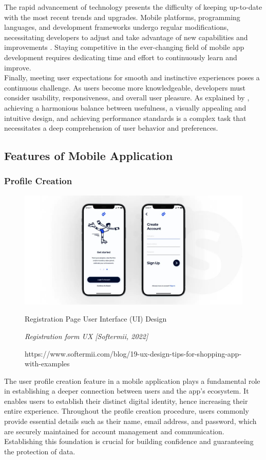 The rapid advancement of technology presents the difficulty of keeping up-to-date with the most recent trends and upgrades. Mobile platforms, programming languages, and development frameworks undergo regular modifications, necessitating developers to adjust and take advantage of new capabilities and improvements \parencite{syeed21}. Staying competitive in the ever-changing field of mobile app development requires dedicating time and effort to continuously learn and improve. \\

Finally, meeting user expectations for smooth and instinctive experiences poses a continuous challenge. As users become more knowledgeable, developers must consider usability, responsiveness, and overall user pleasure. As explained by \textcite{olawole18}, achieving a harmonious balance between usefulness, a visually appealing and intuitive design, and achieving performance standards is a complex task that necessitates a deep comprehension of user behavior and preferences.

\subsection{Features of Mobile Application}
\subsubsection{Profile Creation}
\begin{figure}[h]
    \centering
    \includegraphics[width=0.9\linewidth]{mainmatter/images/userprofile.jpg}
    \caption{Registration Page User Interface (UI) Design}
    \caption*{\textit{Registration form UX [Softermii, 2022]}}
    \caption*{https://www.softermii.com/blog/19-ux-design-tips-for-shopping-app-with-examples}
    \label{fig:myfig10}
\end{figure}
The user profile creation feature in a mobile application plays a fundamental role in establishing a deeper connection between users and the app's ecosystem. It enables users to establish their distinct digital identity, hence increasing their entire experience. Throughout the profile creation procedure, users commonly provide essential details such as their name, email address, and password, which are securely maintained for account management and communication. Establishing this foundation is crucial for building confidence and guaranteeing the protection of data. \\

